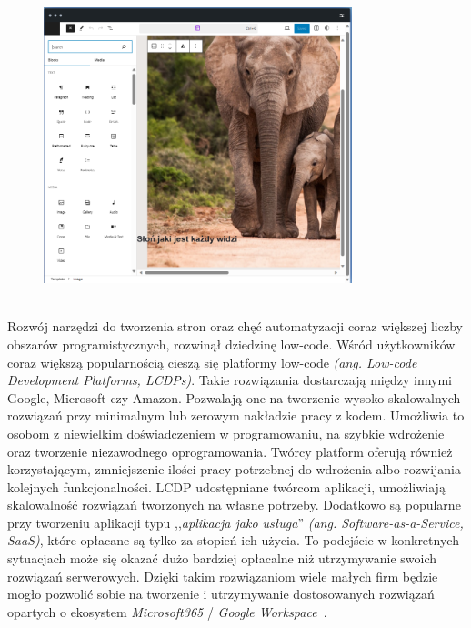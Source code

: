 \begin{figure}[H]
    \centering
    \includegraphics[width=0.8\textwidth]{images/slon_wordpress}
    \label{fig:wp-plat}
\end{figure}
\ \\
Rozwój narzędzi do tworzenia stron oraz chęć automatyzacji coraz większej liczby obszarów programistycznych, rozwinął dziedzinę low-code. Wśród użytkowników coraz większą popularnością cieszą się platformy low-code \textit{(ang. Low-code Development Platforms, LCDPs)}. Takie rozwiązania dostarczają między innymi Google, Microsoft czy Amazon. Pozwalają one na tworzenie wysoko skalowalnych rozwiązań przy minimalnym lub zerowym nakładzie pracy z kodem. Umożliwia to osobom z niewielkim doświadczeniem w programowaniu, na szybkie wdrożenie oraz tworzenie niezawodnego oprogramowania. Twórcy platform oferują również korzystającym, zmniejszenie ilości pracy potrzebnej do wdrożenia albo rozwijania kolejnych funkcjonalności. LCDP udostępniane twórcom aplikacji, umożliwiają skalowalność rozwiązań tworzonych na własne potrzeby. Dodatkowo są popularne przy tworzeniu aplikacji typu ,,\textit{aplikacja jako usługa}'' \textit{(ang. Software-as-a-Service, SaaS)}, które opłacane są tylko za stopień ich użycia. To podejście w konkretnych sytuacjach może się okazać dużo bardziej opłacalne niż utrzymywanie swoich rozwiązań serwerowych. Dzięki takim rozwiązaniom wiele małych firm będzie mogło pozwolić sobie na tworzenie i utrzymywanie dostosowanych rozwiązań opartych o ekosystem \textit{Microsoft365} / \textit{Google Workspace}~\cite{Bock2021,Hirzel2022}.


